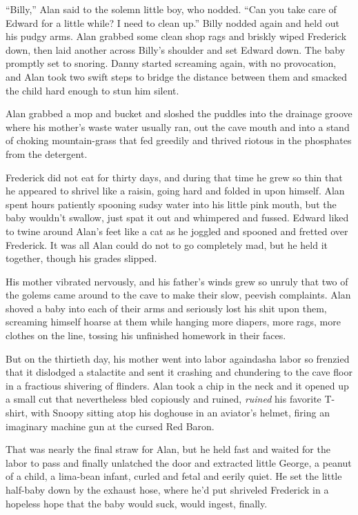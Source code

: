 ``Billy,'' Alan said to the solemn little boy, who nodded.  ``Can you
take care of Edward for a little while?  I need to clean up.'' Billy
nodded again and held out his pudgy arms.  Alan grabbed some clean
shop rags and briskly wiped Frederick down, then laid another across
Billy's shoulder and set Edward down.  The baby promptly set to
snoring.  Danny started screaming again, with no provocation, and Alan
took two swift steps to bridge the distance between them and smacked
the child hard enough to stun him silent.

Alan grabbed a mop and bucket and sloshed the puddles into the
drainage groove where his mother's waste water usually ran, out the
cave mouth and into a stand of choking mountain-grass that fed
greedily and thrived riotous in the phosphates from the detergent.

Frederick did not eat for thirty days, and during that time he grew so
thin that he appeared to shrivel like a raisin, going hard and folded
in upon himself.  Alan spent hours patiently spooning sudsy water into
his little pink mouth, but the baby wouldn't swallow, just spat it out
and whimpered and fussed.  Edward liked to twine around Alan's feet
like a cat as he joggled and spooned and fretted over Frederick.  It
was all Alan could do not to go completely mad, but he held it
together, though his grades slipped.

His mother vibrated nervously, and his father's winds grew so unruly
that two of the golems came around to the cave to make their slow,
peevish complaints.  Alan shoved a baby into each of their arms and
seriously lost his shit upon them, screaming himself hoarse at them
while hanging more diapers, more rags, more clothes on the line,
tossing his unfinished homework in their faces.

But on the thirtieth day, his mother went into labor againdash{}a labor
so frenzied that it dislodged a stalactite and sent it crashing and
chundering to the cave floor in a fractious shivering of flinders. 
Alan took a chip in the neck and it opened up a small cut that
nevertheless bled copiously and ruined, \textit{ruined} his favorite
T-shirt, with Snoopy sitting atop his doghouse in an aviator's helmet,
firing an imaginary machine gun at the cursed Red Baron.

That was nearly the final straw for Alan, but he held fast and waited
for the labor to pass and finally unlatched the door and extracted
little George, a peanut of a child, a lima-bean infant, curled and
fetal and eerily quiet.  He set the little half-baby down by the
exhaust hose, where he'd put shriveled Frederick in a hopeless hope
that the baby would suck, would ingest, finally.

